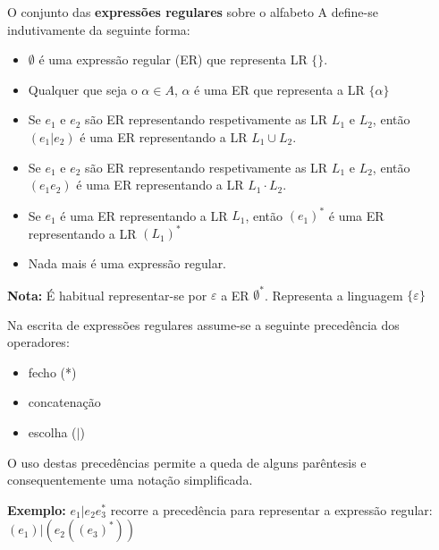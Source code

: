 \documentclass{article}
\begin{document}
\begin{flushleft}
  O conjunto das \textbf{expressões regulares} sobre o alfabeto A define-se
  indutivamente da seguinte forma:
  \begin{itemize}
    \item $\emptyset$ é uma expressão regular (ER) que representa LR $\{\}$.
    \item Qualquer que seja o $\alpha \in A$, $\alpha$ é uma ER que representa a LR $\{\alpha\}$
    \item Se $e_1$ e $e_2$ são ER representando respetivamente as LR $L_1$ e $L_2$, então $(e_1 | e_2)$ é uma
    ER representando a LR $L_1 \cup L_2$.
    \item Se $e_1$ e $e_2$ são ER representando respetivamente as LR $L_1$ e $L_2$, então $(e_1  e_2)$ é uma
    ER representando a LR $L_1 \cdot L_2$.
    \item  Se $e_1$ é uma ER representando a LR $L_1$, então $(e_1)^*$ é uma ER representando a LR $(L_1)^*$
    \item Nada mais é uma expressão regular.
  \end{itemize}

  \textbf{Nota:} É habitual representar-se por $\varepsilon$ a ER $\emptyset^*$. Representa a linguagem $\{\varepsilon\}$

  \item Na escrita de expressões regulares assume-se a seguinte precedência
  dos operadores:
  \begin{itemize}
    \item fecho (*)
    \item concatenação
    \item escolha ($|$)
  \end{itemize}

  \item O uso destas precedências permite a queda de alguns parêntesis e consequentemente uma
  notação simplificada.

  \item \textbf{Exemplo:} $e_1 | e_2 e_3^*$ recorre a precedência para representar a expressão regular: $(e_1) | (e_2((e_3)^*))$
\end{flushleft}

\pagebreak
\end{document}
